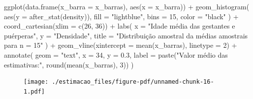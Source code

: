 \documentclass[
  letterpaper,
  DIV=11,
  numbers=noendperiod]{scrreprt}
\newenvironment{Shaded}{\begin{snugshade}}{\end{snugshade}}
\newcommand{\AttributeTok}[1]{\textcolor[rgb]{0.40,0.45,0.13}{#1}}
\newcommand{\DecValTok}[1]{\textcolor[rgb]{0.68,0.00,0.00}{#1}}
\newcommand{\FloatTok}[1]{\textcolor[rgb]{0.68,0.00,0.00}{#1}}
\newcommand{\FunctionTok}[1]{\textcolor[rgb]{0.28,0.35,0.67}{#1}}
\newcommand{\NormalTok}[1]{\textcolor[rgb]{0.00,0.23,0.31}{#1}}
\newcommand{\SpecialCharTok}[1]{\textcolor[rgb]{0.37,0.37,0.37}{#1}}
\newcommand{\StringTok}[1]{\textcolor[rgb]{0.13,0.47,0.30}{#1}}
\begin{document}
\begin{Shaded}
\begin{Highlighting}[]
\FunctionTok{ggplot}\NormalTok{(}\FunctionTok{data.frame}\NormalTok{(}\AttributeTok{x\_barra =}\NormalTok{ x\_barras), }\FunctionTok{aes}\NormalTok{(}\AttributeTok{x =}\NormalTok{ x\_barra))  }\SpecialCharTok{+} 
  \FunctionTok{geom\_histogram}\NormalTok{(}
    \FunctionTok{aes}\NormalTok{(}\AttributeTok{y =} \FunctionTok{after\_stat}\NormalTok{(density)),}
    \AttributeTok{fill =} \StringTok{"lightblue"}\NormalTok{,}
    \AttributeTok{bins =} \DecValTok{15}\NormalTok{,}
    \AttributeTok{color =} \StringTok{"black"}
\NormalTok{    ) }\SpecialCharTok{+}
  \FunctionTok{coord\_cartesian}\NormalTok{(}\AttributeTok{xlim =} \FunctionTok{c}\NormalTok{(}\DecValTok{26}\NormalTok{, }\DecValTok{36}\NormalTok{)) }\SpecialCharTok{+}
  \FunctionTok{labs}\NormalTok{(}
    \AttributeTok{x =} \StringTok{"Idade média das gestantes e puérperas"}\NormalTok{, }
    \AttributeTok{y =} \StringTok{"Densidade"}\NormalTok{,}
    \AttributeTok{title =} \StringTok{"Distribuição amostral da médias amostrais para n = 15"}
\NormalTok{    ) }\SpecialCharTok{+}
  \FunctionTok{geom\_vline}\NormalTok{(}\AttributeTok{xintercept =} \FunctionTok{mean}\NormalTok{(x\_barras), }\AttributeTok{linetype =} \DecValTok{2}\NormalTok{) }\SpecialCharTok{+}
  \FunctionTok{annotate}\NormalTok{(}
    \AttributeTok{geom =} \StringTok{"text"}\NormalTok{,}
    \AttributeTok{x =} \DecValTok{34}\NormalTok{, }
    \AttributeTok{y =} \FloatTok{0.3}\NormalTok{,}
    \AttributeTok{label =} \FunctionTok{paste}\NormalTok{(}\StringTok{"Valor médio das estimativas:"}\NormalTok{, }\FunctionTok{round}\NormalTok{(}\FunctionTok{mean}\NormalTok{(x\_barras), }\DecValTok{3}\NormalTok{))}
\NormalTok{    )}
\end{Highlighting}
\end{Shaded}

\begin{figure}[H]

{\centering \texttt{[image: ./estimacao\_files/figure-pdf/unnamed-chunk-16-1.pdf]}

}

\end{figure}
\end{document}
